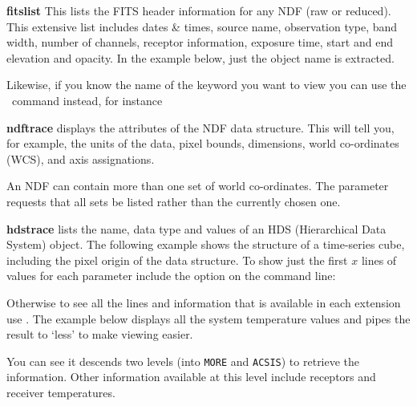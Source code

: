 \documentclass[11pt,oneside,chapters]{starlink}
\begin{document}
\begin{aligndesc}
\item[\textbf{fitslist}]
This lists the FITS header information
for any NDF (raw or reduced). This extensive list includes dates \&
times, source name, observation type, band width, number of channels,
receptor information, exposure time, start and end elevation and
opacity. In the example below, just the object name is extracted.
\begin{terminalv}
\end{terminalv}
Likewise, if you know the name of the keyword you want to view you can
use the \fitsval\ command instead, for instance
\begin{terminalv}
\end{terminalv}

\item[\textbf{ndftrace}]
 displays the attributes of the NDF data structure.
This will tell you, for example, the units of the data, pixel bounds,
dimensions, world co-ordinates (WCS), and axis assignations.
\begin{terminalv}
\end{terminalv}

An NDF can contain more than one set of world co-ordinates. The
 parameter requests that all sets be listed rather
than the currently chosen one.

\item[\textbf{hdstrace}]
 lists the name, data type and values of an HDS
(Hierarchical Data System) object. The following example shows the
structure of a time-series cube, including the pixel origin of the
data structure. To show just the first $x$ lines of values for each
parameter include the option  on the command line:
\begin{terminalv}
\end{terminalv}
Otherwise to see all the lines and information that is available in
each extension use . The example below displays all
the system temperature values and pipes the result to `less' to make
viewing easier.
\begin{terminalv}
\end{terminalv}
\end{aligndesc}
\vspace{0.4cm}

You can see it descends two levels (into \texttt{MORE} and
\texttt{ACSIS}) to retrieve the information. Other information
available at this level include receptors and receiver temperatures.
\end{document}
